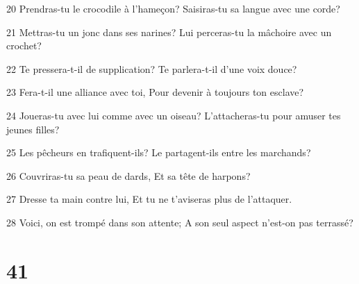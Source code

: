 \par 20 Prendras-tu le crocodile à l'hameçon? Saisiras-tu sa langue avec une corde?
\par 21 Mettras-tu un jonc dans ses narines? Lui perceras-tu la mâchoire avec un crochet?
\par 22 Te pressera-t-il de supplication? Te parlera-t-il d'une voix douce?
\par 23 Fera-t-il une alliance avec toi, Pour devenir à toujours ton esclave?
\par 24 Joueras-tu avec lui comme avec un oiseau? L'attacheras-tu pour amuser tes jeunes filles?
\par 25 Les pêcheurs en trafiquent-ils? Le partagent-ils entre les marchands?
\par 26 Couvriras-tu sa peau de dards, Et sa tête de harpons?
\par 27 Dresse ta main contre lui, Et tu ne t'aviseras plus de l'attaquer.
\par 28 Voici, on est trompé dans son attente; A son seul aspect n'est-on pas terrassé?

\chapter{41}

